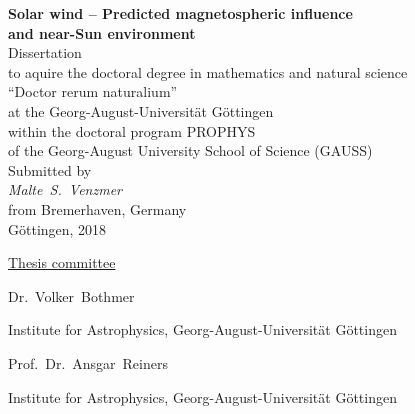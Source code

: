 
\begin{titlepage}
	\begin{center}
		\vspace*{\fill}
		\renewcommand{\baselinestretch}{1.5}
		{\LARGE\sffamily
			\textbf{Solar wind -- Predicted magnetospheric influence\\and near-Sun environment}\\
		}
		\Large\rmfamily
		\vspace{3\baselineskip}
		Dissertation\\
		to aquire the doctoral degree in mathematics and natural science\\	%
		``Doctor rerum naturalium''\\
		at the Georg-August-Universität Göttingen\\
		\vspace{\baselineskip}
		within the doctoral program PROPHYS\\
		of the Georg-August University School of Science (GAUSS)\\
		\vspace{4\baselineskip}
		Submitted by\\
		\textit{%
			Malte~S.~Venzmer\\
		}
		from Bremerhaven, Germany\\
		\vspace{4\baselineskip}
		Göttingen, 2018
		\vspace{\baselineskip}
		\vspace{\fill}
	\end{center}
\end{titlepage}

\newpage


\vspace*{\fill}

\noindent \underline{Thesis committee}
\vspace{\baselineskip}

Dr.~Volker~Bothmer

Institute for Astrophysics, Georg-August-Universität Göttingen
\vspace{\baselineskip}

Prof.~Dr.~Ansgar~Reiners

Institute for Astrophysics, Georg-August-Universität Göttingen
% 
\vspace{3\baselineskip}

